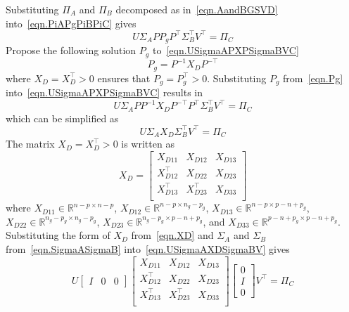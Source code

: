 \documentclass[journal]{IEEEtran}
\theoremstyle{innercustomthm}
\begin{document}
  Substituting $\Pi_{A}$ and $\Pi_{B}$ decomposed as in\ \eqref{eqn.AandBGSVD} into\ \eqref{eqn.PiAPgPiBPiC} gives
  \begin{equation}
    \label{eqn.USigmaAPXPSigmaBVC}
    U\Sigma_{A}PP_{g}P^{\top}\Sigma_{B}^{\top}V^{\top} = \Pi_{C}
  \end{equation}
  Propose the following solution $P_{g}$ to\ \eqref{eqn.USigmaAPXPSigmaBVC}
  \begin{equation}
    \label{eqn.Pg}
    P_{g} = P^{-1}X_{D}P^{-\top}
  \end{equation}
  where $X_{D}=X_{D}^{\top}>0$ ensures that $P_{g}=P_{g}^{\top}>0$.
  Substituting $P_{g}$ from\ \eqref{eqn.Pg} into\ \eqref{eqn.USigmaAPXPSigmaBVC} results in
  \begin{equation*}
    U\Sigma_{A}PP^{-1}X_{D}P^{-\top} P^{\top}\Sigma_{B}^{\top}V^{\top}
    =
    \Pi_{C}
  \end{equation*}
  which can be simplified as
  \begin{equation}
    \label{eqn.USigmaAXDSigmaBV}
    U\Sigma_{A}X_{D}\Sigma_{B}^{\top}V^{\top} = \Pi_{C}
  \end{equation}
  The matrix $X_{D}=X_{D}^{\top}>0$ is written as
  \begin{equation}
    \label{eqn.XD}
    X_{D} =
    \begin{bmatrix}
      X_{D11} & X_{D12} & X_{D13} \\
      X_{D12}^{\top} & X_{D22} & X_{D23} \\
      X_{D13}^{\top} & X_{D23}^{\top} & X_{D33} \\
    \end{bmatrix}
  \end{equation}
  where $X_{D11}\in\mathbb{R}^{n-p\times n-p}$, $X_{D12}\in\mathbb{R}^{n-p\times n_{g}-p_{g}}$, $X_{D13}\in\mathbb{R}^{n-p\times p-n+p_{g}}$, $X_{D22}\in\mathbb{R}^{n_{g}-p_{g}\times n_{g}-p_{g}}$, $X_{D23}\in\mathbb{R}^{n_{g}-p_{g}\times p-n+p_{g}}$, and $X_{D33}\in\mathbb{R}^{p-n+p_{g}\times p-n+p_{g}}$.
  Substituting the form of $X_{D}$ from\ \eqref{eqn.XD} and $\Sigma_{A}$ and $\Sigma_{B}$ from\ \eqref{eqn.SigmaASigmaB} into\ \eqref{eqn.USigmaAXDSigmaBV} gives
  \begin{equation*}
    U
    \begin{bmatrix}
      I & 0 & 0
    \end{bmatrix}
    \begin{bmatrix}
      X_{D11} & X_{D12} & X_{D13} \\
      X_{D12}^{\top} & X_{D22} & X_{D23} \\
      X_{D13}^{\top} & X_{D23}^{\top} & X_{D33} \\
    \end{bmatrix}
    \begin{bmatrix}
      0 \\
      I \\
      0
    \end{bmatrix}
    V^{\top}
    = \Pi_{C}
  \end{equation*}
\end{document}
